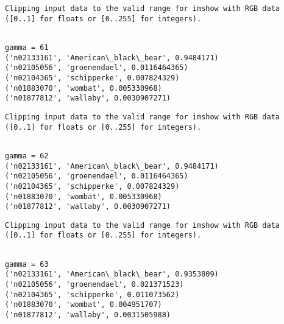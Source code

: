 \documentclass[11pt]{article}
\begin{document}
    \begin{Verbatim}[commandchars=\\\{\}]
Clipping input data to the valid range for imshow with RGB data ([0..1] for floats or [0..255] for integers).

    \end{Verbatim}

    \begin{Verbatim}[commandchars=\\\{\}]

gamma = 61
('n02133161', 'American\_black\_bear', 0.9484171)
('n02105056', 'groenendael', 0.0116464365)
('n02104365', 'schipperke', 0.007824329)
('n01883070', 'wombat', 0.005330968)
('n01877812', 'wallaby', 0.0030907271)

    \end{Verbatim}

    \begin{Verbatim}[commandchars=\\\{\}]
Clipping input data to the valid range for imshow with RGB data ([0..1] for floats or [0..255] for integers).

    \end{Verbatim}

    \begin{Verbatim}[commandchars=\\\{\}]

gamma = 62
('n02133161', 'American\_black\_bear', 0.9484171)
('n02105056', 'groenendael', 0.0116464365)
('n02104365', 'schipperke', 0.007824329)
('n01883070', 'wombat', 0.005330968)
('n01877812', 'wallaby', 0.0030907271)

    \end{Verbatim}

    \begin{Verbatim}[commandchars=\\\{\}]
Clipping input data to the valid range for imshow with RGB data ([0..1] for floats or [0..255] for integers).

    \end{Verbatim}

    \begin{Verbatim}[commandchars=\\\{\}]

gamma = 63
('n02133161', 'American\_black\_bear', 0.9353809)
('n02105056', 'groenendael', 0.021371523)
('n02104365', 'schipperke', 0.011073562)
('n01883070', 'wombat', 0.004951707)
('n01877812', 'wallaby', 0.0031505988)

    \end{Verbatim}
\end{document}
